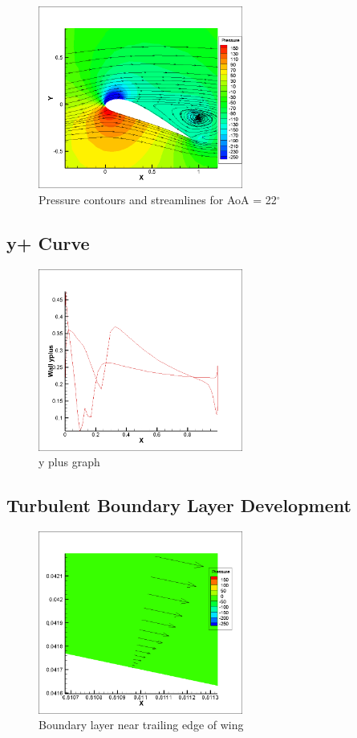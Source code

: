 \begin{figure}[H]
	\centering
	\includegraphics[width=0.6\textwidth]{tecplot_stuff/cont_stream_22.png}
	\caption{Pressure contours and streamlines for AoA = 22$^\circ$}
\label{fig:cont_stream_22}
\end{figure}

\subsection{y+ Curve}

\begin{figure}[H]
	\centering
	\includegraphics[width=0.6\textwidth]{tecplot_stuff/y_plus_0.png}
	\caption{y plus graph}
\label{fig:yplus}
\end{figure}

\subsection{Turbulent Boundary Layer Development}

\begin{figure}[H]
	\centering
	\includegraphics[width=0.6\textwidth]{tecplot_stuff/BL_0.png}
	\caption{Boundary layer near trailing edge of wing}
\label{fig:BL}
\end{figure}
